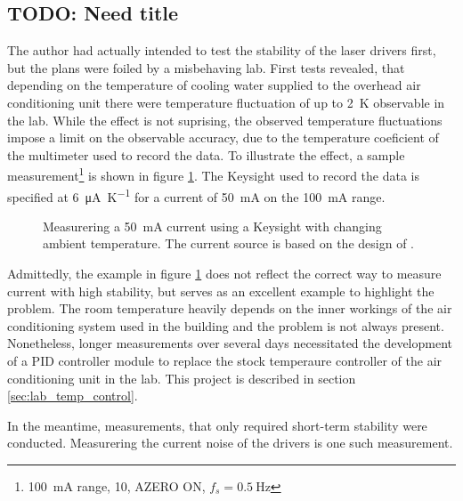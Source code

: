 
\clearpage
\subsection{TODO: Need title}
The author had actually intended to test the stability of the laser drivers first, but the plans were foiled by a misbehaving lab. First tests revealed, that depending on the temperature of cooling water supplied to the overhead air conditioning unit there were temperature fluctuation of up to \qty{2}{\K} observable in the lab. While the effect is not suprising, the observed temperature fluctuations impose a limit on the observable accuracy, due to the temperature coeficient of the multimeter used to record the data. To illustrate the effect, a sample measurement\footnote{\qty{100}{\mA} range, \qty{10}{\plc}, AZERO ON, $f_s = \qty{0.5}{\Hz}$} is shown in figure \ref{fig:laser_driver_aircon}. The Keysight  used to record the data is specified at \qty{6}{\uA \per \K} for a current of \qty{50}{\mA} on the \qty{100}{\mA} range.

\begin{figure}[ht]
    \centering
    
    \caption{Measurering a \qty{50}{\mA} current using a Keysight  with changing ambient temperature. The current source is based on the design of \citeauthor{laser_driver_digital}.}
    \label{fig:laser_driver_aircon}
\end{figure}

Admittedly, the example in figure \ref{fig:laser_driver_aircon} does not reflect the correct way to measure current with high stability, but serves as an excellent example to highlight the problem. The room temperature heavily depends on the inner workings of the air conditioning system used in the building and the problem is not always present. Nonetheless, longer measurements over several days necessitated the development of a PID controller module to replace the stock temperaure controller of the air conditioning unit in the lab. This project is described in section \ref{sec:lab_temp_control}.

In the meantime, measurements, that only required short-term stability were conducted. Measurering the current noise of the drivers is one such measurement.

\clearpage
